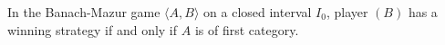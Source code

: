 In the Banach-Mazur game $\langle A, B \rangle$ on a closed interval $I_0$, player $(B)$ has a winning strategy if and only if $A$ is of first category.